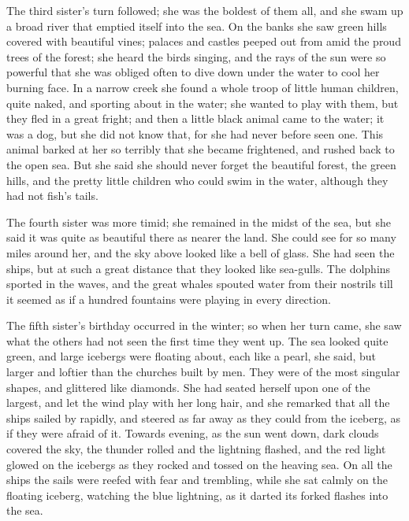 The third sister’s turn followed; she was the boldest of them all, and she swam up a broad river that emptied itself into the sea.
On the banks she saw green hills covered with beautiful vines; palaces and castles peeped out from amid the proud trees of the forest; she heard the birds singing, and the rays of the sun were so powerful that she was obliged often to dive down under the water to cool her burning face.
In a narrow creek she found a whole troop of little human children, quite naked, and sporting about in the water; she wanted to play with them, but they fled in a great fright; and then a little black animal came to the water; it was a dog, but she did not know that, for she had never before seen one.
This animal barked at her so terribly that she became frightened, and rushed back to the open sea.
But she said she should never forget the beautiful forest, the green hills, and the pretty little children who could swim in the water, although they had not fish’s tails.

The fourth sister was more timid; she remained in the midst of the sea, but she said it was quite as beautiful there as nearer the land.
She could see for so many miles around her, and the sky above looked like a bell of glass.
She had seen the ships, but at such a great distance that they looked like sea-gulls.
The dolphins sported in the waves, and the great whales spouted water from their nostrils till it seemed as if a hundred fountains were playing in every direction.

The fifth sister’s birthday occurred in the winter; so when her turn came, she saw what the others had not seen the first time they went up.
The sea looked quite green, and large icebergs were floating about, each like a pearl, she said, but larger and loftier than the churches built by men.
They were of the most singular shapes, and glittered like diamonds.
She had seated herself upon one of the largest, and let the wind play with her long hair, and she remarked that all the ships sailed by rapidly, and steered as far away as they could from the iceberg, as if they were afraid of it.
Towards evening, as the sun went down, dark clouds covered the sky, the thunder rolled and the lightning flashed, and the red light glowed on the icebergs as they rocked and tossed on the heaving sea.
On all the ships the sails were reefed with fear and trembling, while she sat calmly on the floating iceberg, watching the blue lightning, as it darted its forked flashes into the sea.

